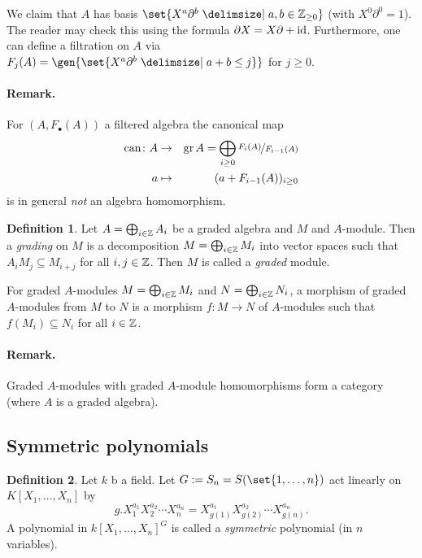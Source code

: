 \documentclass[12pt,a4paper]{scrartcl}
\theoremstyle{cplain}
\theoremstyle{cplain}
\theoremstyle{cplain}
\theoremstyle{definition}
\newtheorem*{deff}{Definition}
\begin{document}
\begin{otherlanguage}{english}
\begin{enumerate}
  We claim that $A$ has basis $\set{X^a\partial^b \given a,b \in \IZ_{\ge 0}}$ (with $X^0\partial^0 = 1$). The reader may check this using the formula $\partial X = X\partial + \operatorname{id}$. Furthermore, one can define a filtration on $A$ via $F_j(A) = \gen{\set{X^a\partial^b \given a+b \le j}}$ for $j \ge 0$.
\end{enumerate}


\paragraph{Remark.}
For $(A,F_\bullet(A))$ a filtered algebra the canonical map
\begin{eqnarray*}
  \operatorname{can}\colon A &\to& \operatorname{gr} A = \bigoplus_{i\ge0}\nicefrac{F_i(A)}{F_{i-1}(A)} \\
  a &\mapsto& (a+F_{i-1}(A))_{i\ge0}
\end{eqnarray*}
is in general \emph{not} an algebra homomorphism.

\begin{deff}
  Let $A = \bigoplus_{i\in\mathbb Z} A_i$ be a graded algebra and $M$ and $A$-module. Then a \emph{grading} on $M$ is a decomposition $M=\bigoplus_{i\in\mathbb Z}M_i$ into vector spaces such that $A_iM_j \subseteq M_{i+j}$ for all $i,j\in \mathbb Z$. Then $M$ is called a \emph{graded} module.
  
  For graded $A$-modules $M=\bigoplus_{i\in\mathbb Z}M_i$ and $N=\bigoplus_{i\in\mathbb Z}N_i$, a morphism of graded $A$-modules from $M$ to $N$ is a morphism $f\colon M \to N$ of $A$-modules such that $f(M_i)\subseteq N_i$ for all $i\in\mathbb Z$.
\end{deff}

\paragraph{Remark.} Graded $A$-modules with graded $A$-module homomorphisms form a category (where $A$ is a graded algebra).

\subsection{Symmetric polynomials}
\begin{deff}
  Let $k$ b a field. Let $G := S_n = S(\set{1,\ldots,n})$ act linearly on $K[X_1,\ldots,X_n]$ by \begin{equation} g. X_1^{a_1}X_2^{a_2}\cdots X_n^{a_n} = X_{g(1)}^{a_1}X_{g(2)}^{a_2}\cdots X_{g(n)}^{a_n}. \tag{*}\label{def:symmetric poly:eq} \end{equation}
  A polynomial in $k[X_1,\ldots,X_n]^G$ is called a \emph{symmetric} polynomial (in $n$ variables).
\end{deff}


\end{otherlanguage}
\end{document}
